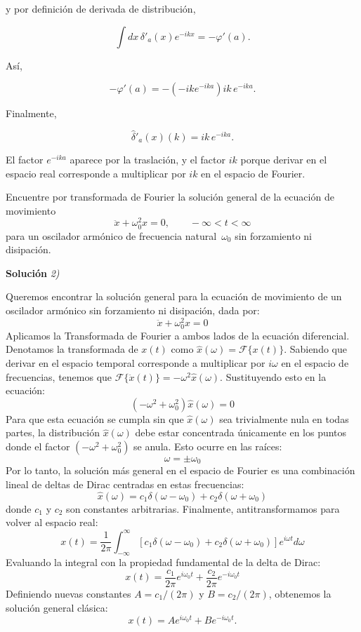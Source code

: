 \documentclass[11pt,spanish]{article}
\newcounter{problema}
\newcommand{\prob}{\stepcounter{problema} \vspace{.5cm} \noindent{\bf Problema \arabic{problema}: }}
\begin{document}
y por definición de derivada de distribución,

$$
\int dx\, \delta'_a(x)e^{-ikx}
=
-\varphi'(a).
$$

Así,

$$
-\varphi'(a)
=
-(-ik e^{-ika})
ik\,e^{-ika}.
$$

Finalmente,

$$
\boxed{
\hat{\delta}'_a(x)(k)
=
ik\,e^{-ika}
}.
$$

El factor $e^{-ika}$ aparece por la traslación, y el factor $ik$ porque derivar en el espacio real corresponde a multiplicar por $ik$ en el espacio de Fourier.


\prob Encuentre por transformada de Fourier la soluci\'on general de la ecuaci\'on de movimiento
\[
\ddot{x} + \omega_0^2 x = 0, \qquad -\infty < t < \infty
\]
para un oscilador arm\'onico de frecuencia natural~$\omega_0$ sin forzamiento ni disipaci\'on.

\vspace{0.5cm}
{\bf Soluci\'on }{\em 2)}
\vspace{0.5cm}

Queremos encontrar la solución general para la ecuación de movimiento de un oscilador armónico sin forzamiento ni disipación, dada por:
$$\ddot{x}+\omega_{0}^{2}x=0$$
Aplicamos la Transformada de Fourier a ambos lados de la ecuación diferencial. Denotamos la transformada de $x(t)$ como $\hat{x}(\omega) = \mathcal{F}\{x(t)\}$.
Sabiendo que derivar en el espacio temporal corresponde a multiplicar por $i\omega$ en el espacio de frecuencias, tenemos que $\mathcal{F}\{\ddot{x}(t)\} = -\omega^2 \hat{x}(\omega)$.
Sustituyendo esto en la ecuación:
$$(-\omega^2 + \omega_0^2)\hat{x}(\omega) = 0$$
Para que esta ecuación se cumpla sin que $\hat{x}(\omega)$ sea trivialmente nula en todas partes, la distribución $\hat{x}(\omega)$ debe estar concentrada únicamente en los puntos donde el factor $(-\omega^2 + \omega_0^2)$ se anula. Esto ocurre en las raíces:
$$\omega = \pm \omega_0$$
Por lo tanto, la solución más general en el espacio de Fourier es una combinación lineal de deltas de Dirac centradas en estas frecuencias:
$$\hat{x}(\omega) = c_1 \delta(\omega - \omega_0) + c_2 \delta(\omega + \omega_0)$$
donde $c_1$ y $c_2$ son constantes arbitrarias.
Finalmente, antitransformamos para volver al espacio real:
$$x(t) = \frac{1}{2\pi} \int_{-\infty}^{\infty} \left[ c_1 \delta(\omega - \omega_0) + c_2 \delta(\omega + \omega_0) \right] e^{i\omega t} d\omega$$
Evaluando la integral con la propiedad fundamental de la delta de Dirac:
$$x(t) = \frac{c_1}{2\pi} e^{i\omega_0 t} + \frac{c_2}{2\pi} e^{-i\omega_0 t}$$
Definiendo nuevas constantes $A = c_1 / (2\pi)$ y $B = c_2 / (2\pi)$, obtenemos la solución general clásica:
$$x(t) = A e^{i\omega_0 t} + B e^{-i\omega_0 t}.$$
\end{document}
